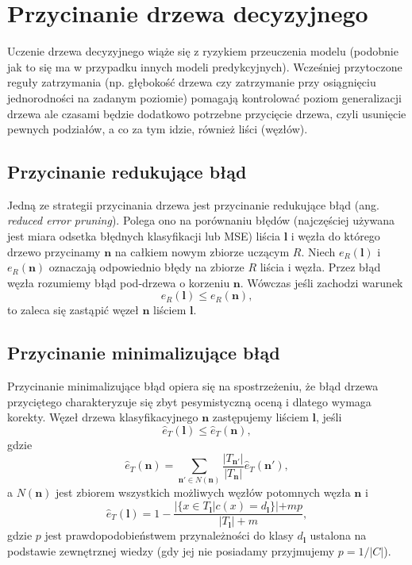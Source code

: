 \documentclass[
]{book}
\theoremstyle{plain}
\theoremstyle{definition}
\theoremstyle{definition}
\theoremstyle{definition}
\theoremstyle{definition}
\theoremstyle{definition}
\theoremstyle{remark}
\begin{document}
\section{Przycinanie drzewa decyzyjnego}\label{przycinanie-drzewa-decyzyjnego}

Uczenie drzewa decyzyjnego wiąże się z ryzykiem przeuczenia modelu (podobnie jak to się ma w przypadku innych modeli predykcyjnych). Wcześniej przytoczone reguły zatrzymania (np. głębokość drzewa czy zatrzymanie przy osiągnięciu jednorodności na zadanym poziomie) pomagają kontrolować poziom generalizacji drzewa ale czasami będzie dodatkowo potrzebne przycięcie drzewa, czyli usunięcie pewnych podziałów, a co za tym idzie, również liści (węzłów).

\subsection{Przycinanie redukujące błąd}\label{przycinanie-redukujux105ce-bux142ux105d}

Jedną ze strategii przycinania drzewa jest przycinanie redukujące błąd (ang. \emph{reduced error pruning}). Polega ono na porównaniu błędów (najczęściej używana jest miara odsetka błędnych klasyfikacji lub MSE) liścia \(\mathbf{l}\) i węzła do którego drzewo przycinamy \(\mathbf{n}\) na całkiem nowym zbiorze uczącym \(R\). Niech \(e_R(\mathbf{l})\) i \(e_R(\mathbf{n})\) oznaczają odpowiednio błędy na zbiorze \(R\) liścia i węzła. Przez błąd węzła rozumiemy błąd pod-drzewa o korzeniu \(\mathbf{n}\). Wówczas jeśli zachodzi warunek
\begin{equation}
    e_R(\mathbf{l})\leq e_R(\mathbf{n}), 
\end{equation}
to zaleca się zastąpić węzeł \(\mathbf{n}\) liściem \(\mathbf{l}\).

\subsection{Przycinanie minimalizujące błąd}\label{przycinanie-minimalizujux105ce-bux142ux105d}

Przycinanie minimalizujące błąd opiera się na spostrzeżeniu, że błąd drzewa przyciętego charakteryzuje się zbyt pesymistyczną oceną i dlatego wymaga korekty. Węzeł drzewa klasyfikacyjnego \(\mathbf{n}\) zastępujemy liściem \(\mathbf{l}\), jeśli
\begin{equation}
    \hat{e}_T(\mathbf{l})\leq \hat{e}_T(\mathbf{n}),
\end{equation}
gdzie
\begin{equation}
    \hat{e}_T(\mathbf{n})=\sum_{\mathbf{n}'\in N(\mathbf{n})}\frac{|T_{\mathbf{n}'}|}{|T_\mathbf{n}|}\hat{e}_T(\mathbf{n}'),
\end{equation}
a \(N(\mathbf{n})\) jest zbiorem wszystkich możliwych węzłów potomnych węzła \(\mathbf{n}\) i \begin{equation}
    \hat{e}_T(\mathbf{l})=1-\frac{|\{x\in T_\mathbf{l}|c(x)=d_{\mathbf{l}}\}|+mp}{|T_\mathbf{l}|+m},
\end{equation}
gdzie \(p\) jest prawdopodobieństwem przynależności do klasy \(d_{\mathbf{l}}\) ustalona na podstawie zewnętrznej wiedzy (gdy jej nie posiadamy przyjmujemy \(p=1/|C|\)).
\end{document}
